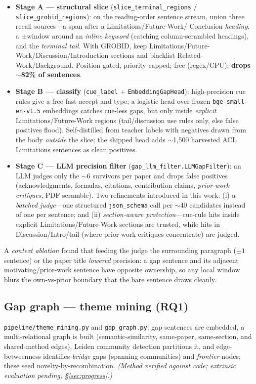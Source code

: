 \begin{itemize}
  \item \textbf{Stage A --- structural slice} (\texttt{slice\_terminal\_regions} /
        \texttt{slice\_grobid\_regions}): on the reading-order sentence stream,
        union three recall sources---a span after a Limitations/Future-Work/%
        Conclusion \emph{heading}, a $\pm$window around an \emph{inline keyword}
        (catching column-scrambled headings), and the \emph{terminal tail}. With
        GROBID, keep Limitations/Future-Work/Discussion/Introduction sections and
        blacklist Related-Work/Background. Position-gated, priority-capped; free
        (regex/CPU); \textbf{drops $\sim$82\% of sentences}.
  \item \textbf{Stage B --- classify} (\texttt{cue\_label} +
        \texttt{EmbeddingGapHead}): high-precision cue rules give a free
        fast-accept and type; a logistic head over frozen \texttt{bge-small-en-v1.5}
        embeddings \citep{bgesmall} catches cue-less gaps, but only inside
        \emph{explicit} Limitations/Future-Work regions (tail/discussion use rules
        only, else false positives flood). Self-distilled from teacher labels with
        negatives drawn from the body \emph{outside} the slice; the shipped head
        adds $\sim$1{,}500 harvested ACL Limitations sentences as clean positives.
  \item \textbf{Stage C --- LLM precision filter}
        (\texttt{gap\_llm\_filter.LLMGapFilter}): an LLM judges only the $\sim$6
        survivors per paper and drops false positives (acknowledgments, formulas,
        citations, contribution claims, \emph{prior-work critiques}, PDF scramble).
        Two refinements introduced in this work: (i) a \emph{batched judge}---one
        structured \texttt{json\_schema} call per $\sim$40 candidates instead of
        one per sentence; and (ii) \emph{section-aware protection}---cue-rule hits
        inside explicit Limitations/Future-Work sections are trusted, while hits in
        Discussion/Intro/tail (where prior-work critiques concentrate) are judged.
\end{itemize}

A \emph{context ablation} found that feeding the judge the surrounding paragraph
($\pm 1$ sentence) or the paper title \emph{lowered} precision: a gap sentence and
its adjacent motivating/prior-work sentence have opposite ownership, so any local
window blurs the own-vs-prior boundary that the bare sentence draws cleanly.

\subsection{Gap graph --- theme mining (RQ1)}
\texttt{pipeline/theme\_mining.py} and \texttt{gap\_graph.py}: gap sentences are
embedded, a multi-relational graph is built (semantic-similarity, same-paper,
same-section, and shared-method edges), Leiden community detection
\citep{leiden} partitions it, and edge-betweenness identifies \emph{bridge} gaps
(spanning communities) and \emph{frontier} nodes; these seed
novelty-by-recombination. \emph{(Method verified against code; extrinsic
evaluation pending, \S\ref{sec:progress}.)}

